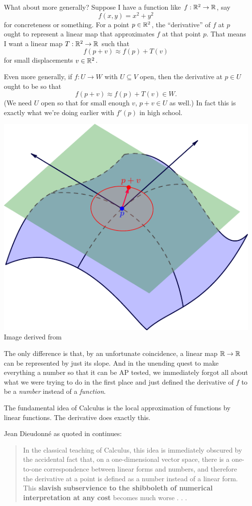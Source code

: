 What about more generally?
Suppose I have a function like $f : \mathbb R^2 \to \mathbb R$, say 
\[ f(x,y) = x^2+y^2 \]
for concreteness or something.
For a point $p \in \mathbb R^2$, the ``derivative'' of $f$ at $p$ ought to represent a linear map
that approximates $f$ at that point $p$.
That means I want a linear map $T : \mathbb R^2 \to \mathbb R$ such that
\[ f(p + v) \approx f(p) + T(v) \]
for small displacements $v \in \mathbb R^2$.

Even more generally, if $f : U \to W$ with $U \subseteq V$ open,
then the derivative at $p \in U$ ought to be so that
\[ f(p + v) \approx f(p) + T(v) \in W. \]
(We need $U$ open so that for small enough $v$, $p+v \in U$ as well.)
In fact this is exactly what we're doing earlier with $f'(p)$ in high school.

\begin{center}
	\includegraphics{media/tangent.pdf}
	\\ \tiny Image derived from \cite{img:tangentplane}
\end{center}


The only difference is that, by an unfortunate coincidence,
a linear map $\mathbb R \to \mathbb R$ can be represented by just its slope.
And in the unending quest to make everything a number so that it can be AP tested,
we immediately forgot all about what we were trying to do in the first place
and just defined the derivative of $f$ to be a \emph{number} instead of a \emph{function}.

\begin{moral}
	The fundamental idea of Calculus is the local approximation of functions by linear functions.
	The derivative does exactly this.
\end{moral}
Jean Dieudonn\'e as quoted in \cite{ref:pugh} continues:
\begin{quote}
	In the classical teaching of Calculus, this idea is immediately obscured
	by the accidental fact that, on a one-dimensional vector space,
	there is a one-to-one correspondence between linear forms and numbers,
	and therefore the derivative at a point is defined as a number instead of a linear form.
	This \textbf{slavish subservience to the shibboleth of numerical interpretation at any cost}
	becomes much worse . . .
\end{quote}

